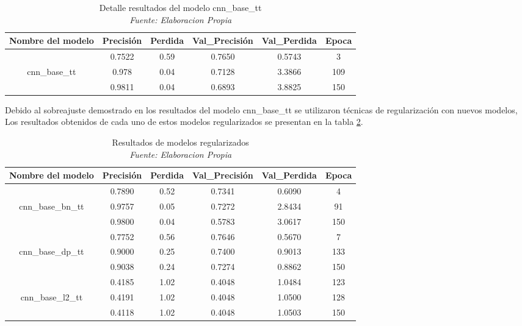 \begin{table}[!ht]
	\centering
	\begin{tabular}{|c|c|c|c|c|c|}
		\hline
		\textbf{Nombre del modelo} & \textbf{Precisión} & \textbf{Perdida} & \textbf{Val\_Precisión} & \textbf{Val\_Perdida} & \textbf{Epoca} \\ \hline
		~ & 0.7522 & 0.59 & 0.7650 & 0.5743 & 3 \\ \cline{2-6} 
		cnn\_base\_tt & 0.978 & 0.04 & 0.7128 & 3.3866 & 109 \\ \cline{2-6} 
		~ & 0.9811 & 0.04 & 0.6893 & 3.8825 & 150 \\ \hline
	\end{tabular}
	\caption[Detalle resultados del modelo cnn\_base\_tt]{Detalle resultados del modelo cnn\_base\_tt
		\\\textit{Fuente: Elaboracion Propia}}
	\label{tbl:6}
\end{table}

Debido al sobreajuste demostrado en los resultados del modelo cnn\_base\_tt se utilizaron técnicas de regularización con nuevos modelos, Los resultados obtenidos de cada uno de estos modelos regularizados se presentan en la tabla \ref{tbl:7}.

\begin{table}[!ht]
	\centering
	\begin{tabular}{|c|c|c|c|c|c|}
		\hline
		\textbf{Nombre del modelo} & \textbf{Precisión} & \textbf{Perdida} & \textbf{Val\_Precisión} & \textbf{Val\_Perdida} & \textbf{Epoca} \\ \hline
		~ & 0.7890 & 0.52 & 0.7341 & 0.6090 & 4 \\ \cline{2-6} 
		cnn\_base\_bn\_tt & 0.9757 & 0.05 & 0.7272 & 2.8434 & 91 \\ \cline{2-6} 
		~ & 0.9800 & 0.04 & 0.5783 & 3.0617 & 150 \\ \hline
		~ & 0.7752 & 0.56 & 0.7646 & 0.5670 & 7 \\ \cline{2-6} 
		cnn\_base\_dp\_tt & 0.9000 & 0.25 & 0.7400 & 0.9013 & 133 \\ \cline{2-6} 
		~ & 0.9038 & 0.24 & 0.7274 & 0.8862 & 150 \\ \hline
		~ & 0.4185 & 1.02 & 0.4048 & 1.0484 & 123 \\ \cline{2-6} 
		cnn\_base\_l2\_tt & 0.4191 & 1.02 & 0.4048 & 1.0500 & 128 \\ \cline{2-6} 
		~ & 0.4118 & 1.02 & 0.4048 & 1.0503 & 150 \\ \hline
	\end{tabular}
	\caption[Resultados de modelos regularizados]{Resultados de modelos regularizados
		\\\textit{Fuente: Elaboracion Propia}}
	\label{tbl:7}
\end{table}

